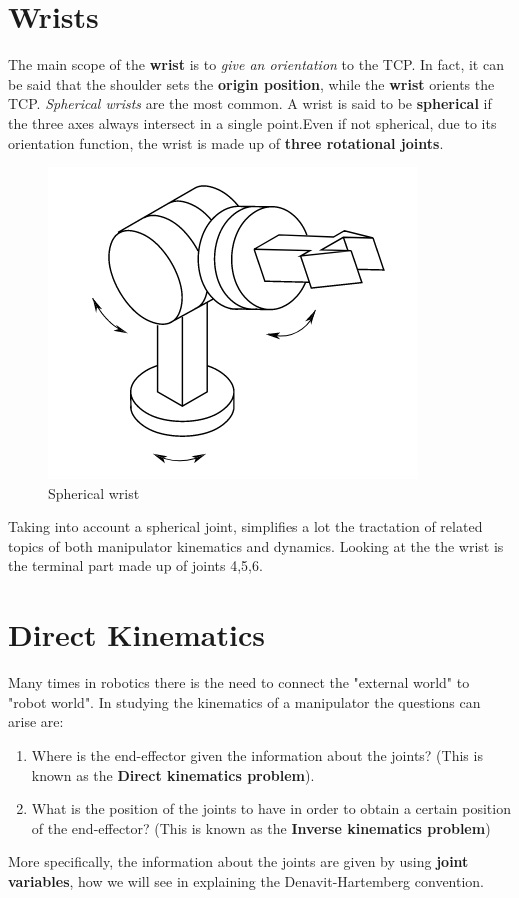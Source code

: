 

\section{Wrists}
The main scope of the \textbf{wrist} is to \textit{give an orientation} to the TCP. In fact, it can be said that the shoulder sets the \textbf{origin position}, while the \textbf{wrist} orients the TCP. \textit{Spherical wrists} are the most common. A wrist is said to be \textbf{spherical} if the three axes always intersect in a single point.Even if not spherical, due to its orientation function, the wrist is made up of \textbf{three rotational joints}.

\begin{figure}[h]
    \centering
    \includegraphics[scale=0.7]{img/polso.png}
    \caption{Spherical wrist}
\end{figure}
Taking into account a spherical joint, simplifies a lot the tractation of related topics of both manipulator kinematics and dynamics. Looking at the  the wrist is the terminal part made up of joints 4,5,6.
 
\section{Direct Kinematics}
Many times in robotics there is the need to connect the "external world" to "robot world". In studying the kinematics of a manipulator the questions can arise are:
\begin{enumerate}
    \item Where is the end-effector given the information about the joints? (This is known as the \textbf{Direct kinematics problem}).
    \item What is the position of the joints to have in order to obtain a certain position of the end-effector? (This is known as the \textbf{Inverse kinematics problem})
\end{enumerate}
More specifically, the information about the joints are given by using \textbf{joint variables}, how we will see in explaining the Denavit-Hartemberg convention.

